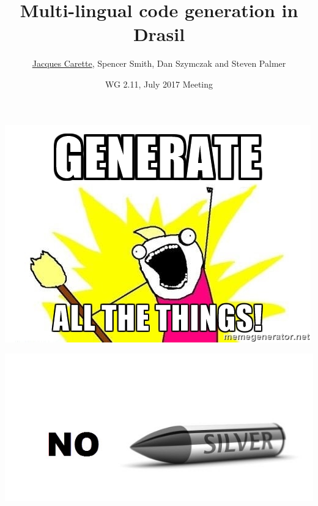 \documentclass{beamer}
\title[GOOL]{Multi-lingual code generation in Drasil}
\author{\underline{Jacques Carette}, Spencer Smith, Dan Szymczak and
Steven Palmer}
\institute[McMaster University]{McMaster University}
\date[July 2017]{WG 2.11, July 2017 Meeting}
\begin{document}

\begin{frame}
\titlepage
\end{frame}

\begin{frame}
\includegraphics{generate_all_the_things.jpg}
\end{frame}

\begin{frame}
\includegraphics[width=\textwidth]{no_silver_bullet.jpg}
\end{frame}
\end{document}
